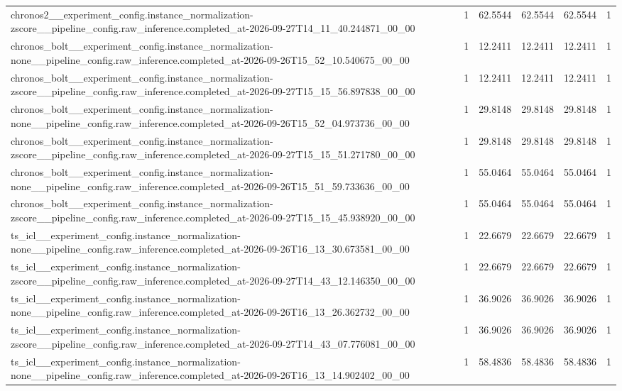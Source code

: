 \begin{tabular}{llllll}
chronos2\_\_experiment\_config.instance\_normalization-zscore\_\_pipeline\_config.raw\_inference.completed\_at-2026-09-27T14\_11\_40.244871\_00\_00 & 1 & 62.5544 & 62.5544 & 62.5544 & 1 \\
chronos\_bolt\_\_experiment\_config.instance\_normalization-none\_\_pipeline\_config.raw\_inference.completed\_at-2026-09-26T15\_52\_10.540675\_00\_00 & 1 & 12.2411 & 12.2411 & 12.2411 & 1 \\
chronos\_bolt\_\_experiment\_config.instance\_normalization-zscore\_\_pipeline\_config.raw\_inference.completed\_at-2026-09-27T15\_15\_56.897838\_00\_00 & 1 & 12.2411 & 12.2411 & 12.2411 & 1 \\
chronos\_bolt\_\_experiment\_config.instance\_normalization-none\_\_pipeline\_config.raw\_inference.completed\_at-2026-09-26T15\_52\_04.973736\_00\_00 & 1 & 29.8148 & 29.8148 & 29.8148 & 1 \\
chronos\_bolt\_\_experiment\_config.instance\_normalization-zscore\_\_pipeline\_config.raw\_inference.completed\_at-2026-09-27T15\_15\_51.271780\_00\_00 & 1 & 29.8148 & 29.8148 & 29.8148 & 1 \\
chronos\_bolt\_\_experiment\_config.instance\_normalization-none\_\_pipeline\_config.raw\_inference.completed\_at-2026-09-26T15\_51\_59.733636\_00\_00 & 1 & 55.0464 & 55.0464 & 55.0464 & 1 \\
chronos\_bolt\_\_experiment\_config.instance\_normalization-zscore\_\_pipeline\_config.raw\_inference.completed\_at-2026-09-27T15\_15\_45.938920\_00\_00 & 1 & 55.0464 & 55.0464 & 55.0464 & 1 \\
ts\_icl\_\_experiment\_config.instance\_normalization-none\_\_pipeline\_config.raw\_inference.completed\_at-2026-09-26T16\_13\_30.673581\_00\_00 & 1 & 22.6679 & 22.6679 & 22.6679 & 1 \\
ts\_icl\_\_experiment\_config.instance\_normalization-zscore\_\_pipeline\_config.raw\_inference.completed\_at-2026-09-27T14\_43\_12.146350\_00\_00 & 1 & 22.6679 & 22.6679 & 22.6679 & 1 \\
ts\_icl\_\_experiment\_config.instance\_normalization-none\_\_pipeline\_config.raw\_inference.completed\_at-2026-09-26T16\_13\_26.362732\_00\_00 & 1 & 36.9026 & 36.9026 & 36.9026 & 1 \\
ts\_icl\_\_experiment\_config.instance\_normalization-zscore\_\_pipeline\_config.raw\_inference.completed\_at-2026-09-27T14\_43\_07.776081\_00\_00 & 1 & 36.9026 & 36.9026 & 36.9026 & 1 \\
ts\_icl\_\_experiment\_config.instance\_normalization-none\_\_pipeline\_config.raw\_inference.completed\_at-2026-09-26T16\_13\_14.902402\_00\_00 & 1 & 58.4836 & 58.4836 & 58.4836 & 1 \\

\end{tabular}
